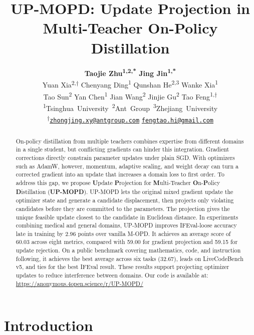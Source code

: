 \documentclass{article}
\title{UP-MOPD: Update Projection in Multi-Teacher On-Policy Distillation}
\author{%
{\bfseries Taojie Zhu\textsuperscript{1,2,*}\quad
Jing Jin\textsuperscript{1,*}}\\[3pt]
{\normalfont Yuan Xia\textsuperscript{2,$\dagger$}\quad
Chenyang Ding\textsuperscript{1}\quad
Qunshan He\textsuperscript{2,3}\quad
Wanke Xia\textsuperscript{1}}\\[3pt]
{\normalfont Tao Sun\textsuperscript{2}\quad
Yan Chen\textsuperscript{1}\quad
Jian Wang\textsuperscript{2}\quad
Jinjie Gu\textsuperscript{2}\quad
Tao Feng\textsuperscript{1,$\dagger$}}\\[7pt]
{\normalfont\small\mbox{\textsuperscript{1}Tsinghua University\quad
\textsuperscript{2}Ant Group\quad
\textsuperscript{3}Zhejiang University}}\\[5pt]
{\normalfont\small\textsuperscript{$\dagger$}\href{mailto:zhongjing.xy@antgroup.com}{\texttt{zhongjing.xy@antgroup.com}}\quad
\href{mailto:fengtao.hi@gmail.com}{\texttt{fengtao.hi@gmail.com}}}%
}
\date{}
\begin{document}
\raggedbottom
\maketitle
\fancyhf{}
\fancyfoot[C]{\thepage}
\renewcommand{\headrulewidth}{0pt}
\renewcommand{\footrulewidth}{0pt}
\pagestyle{fancy}
\thispagestyle{fancy}
\begingroup
\renewcommand{\thefootnote}{\fnsymbol{footnote}}
\endgroup

\begin{abstract}
On-policy distillation from multiple teachers combines expertise from different domains in a single student, but conflicting gradients can hinder this integration.
Gradient corrections directly constrain parameter updates under plain SGD.
With optimizers such as AdamW, however, momentum, adaptive scaling, and weight decay can turn a corrected gradient into an update that increases a domain loss to first order.
To address this gap, we propose \textbf{U}pdate \textbf{P}rojection for \textbf{M}ulti-Teacher \textbf{O}n-\textbf{P}olicy \textbf{D}istillation (\textbf{UP-MOPD}).
UP-MOPD lets the original mixed gradient update the optimizer state and generate a candidate displacement, then projects only violating candidates before they are committed to the parameters.
The projection gives the unique feasible update closest to the candidate in Euclidean distance.
In experiments combining medical and general domains, UP-MOPD improves IFEval-loose accuracy late in training by 2.96 points over vanilla M-OPD.
It achieves an average score of 60.03 across eight metrics, compared with 59.00 for gradient projection and 59.15 for update rejection.
On a public benchmark covering mathematics, code, and instruction following, it achieves the best average across six tasks (32.67), leads on LiveCodeBench v5, and ties for the best IFEval result.
These results support projecting optimizer updates to reduce interference between domains. Our code is available at: \url{https://anonymous.4open.science/r/UP-MOPD/}
\end{abstract}

\section{Introduction}
\end{document}
